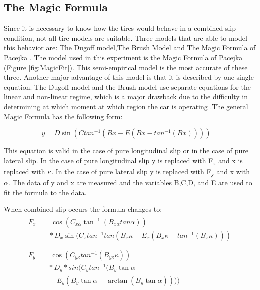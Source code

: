 \subsection{The Magic Formula}	
Since it is necessary to know how the tires would behave in a combined slip condition, not all tire models are suitable. Three models that are able to model this behavior  are: The Dugoff model,The Brush Model and The Magic Formula of Pacejka \cite{Pacejka}. The model used in this experiment is the Magic Formula of Pacejka (Figure \ref{fig:MagicFit}). This semi-empirical model is the most accurate of these three. Another major advantage of this model is that it is described by one single equation. The Dugoff model and the Brush model use separate equations for the linear and non-linear regime, which is a major drawback due to the difficulty in determining at which moment at which region the car is operating \cite{uil}.The general Magic Formula has the following form:

\begin{equation}
	y = D\sin (Ctan^{-1}(Bx-E(Bx-tan^{-1}(Bx)))) \quad
    \label{eq:magicf}
\end{equation}

This equation is valid in the case of pure longitudinal slip or in the case of pure lateral slip. In the case of pure longitudinal slip y is replaced with F\textsubscript{x} and x is replaced with $\kappa$. In the case of pure lateral slip y is replaced with F\textsubscript{y} and x with $\alpha$. The data of y and x are measured and the variables B,C,D, and E are used to fit the formula to the data.

When combined slip occurs the formula changes to:
\begin{subequations}
\begin{align}
\begin{split}
F_{x}&=\cos(C_{x\alpha}\tan^{-1}(B_{x\alpha}tan\alpha))\\
& \quad *D_{x}\sin(C_{x}tan^{-1}tan(B_{x}\kappa-E_{x}(B_{x}\kappa-tan^{-1}(B_{x}\kappa)))\\
\end{split} \label{eqmagiccombined1}\\
\begin{split}
F_{y}&=\cos(C_{y\kappa}tan^{-1}(B_{y\kappa}\kappa))\\
& \quad *D_{y}*sin(C_{y}tan^{-1}(B_{y}\tan\alpha\\
& \quad -E_{y}(B_{y}\tan\alpha-\arctan(B_{y}\tan\alpha))))\\
\end{split} \label{eq:magiccombined2}
\end{align}
\end{subequations}


